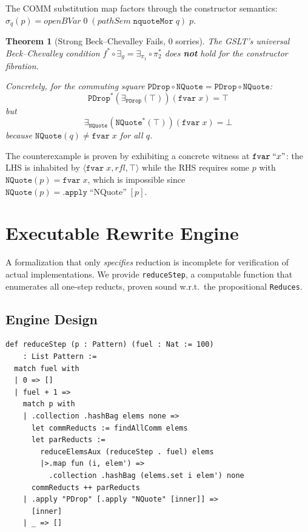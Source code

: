 \documentclass[]{article}
\newtheorem{theorem}{Theorem}
\newcommand{\code}[1]{\texttt{#1}}
\begin{document}
The COMM substitution map factors through the constructor semantics:
$\sigma_q(p) = \mathit{openBVar}\;0\;(\mathit{pathSem}\;\mathtt{nquoteMor}\;q)\;p$.

\begin{theorem}[Strong Beck--Chevalley Fails, 0 sorries]
\label{thm:bc-fails}
The GSLT's universal Beck--Chevalley condition
$f^* \circ \exists_g = \exists_{\pi_1} \circ \pi_2^*$
does \textbf{not} hold for the constructor fibration.

Concretely, for the commuting square
$\code{PDrop} \circ \code{NQuote} = \code{PDrop} \circ \code{NQuote}$:
$$\code{PDrop}^*(\exists_{\code{PDrop}}(\top))(\code{fvar}\;x) = \top$$
but
$$\exists_{\code{NQuote}}(\code{NQuote}^*(\top))(\code{fvar}\;x) = \bot$$
because $\code{NQuote}(q) \ne \code{fvar}\;x$ for all $q$.
\end{theorem}

The counterexample is proven by exhibiting a concrete witness at
$\code{fvar}\;``x"$: the LHS is inhabited by $\langle \code{fvar}\;x, \mathit{rfl},
\top \rangle$ while the RHS requires some $p$ with
$\code{NQuote}(p) = \code{fvar}\;x$, which is impossible since
$\code{NQuote}(p) = \code{.apply}\;\text{``NQuote''}\;[p]$.

\section{Executable Rewrite Engine}

A formalization that only \emph{specifies} reduction is incomplete for verification
of actual implementations.  We provide \code{reduceStep}, a computable function that
enumerates all one-step reducts, proven sound w.r.t.\ the propositional \code{Reduces}.

\subsection{Engine Design}

\begin{lstlisting}[caption={The executable engine (Engine.lean)}]
def reduceStep (p : Pattern) (fuel : Nat := 100)
    : List Pattern :=
  match fuel with
  | 0 => []
  | fuel + 1 =>
    match p with
    | .collection .hashBag elems none =>
      let commReducts := findAllComm elems
      let parReducts :=
        reduceElemsAux (reduceStep . fuel) elems
        |>.map fun (i, elem') =>
          .collection .hashBag (elems.set i elem') none
      commReducts ++ parReducts
    | .apply "PDrop" [.apply "NQuote" [inner]] =>
      [inner]
    | _ => []
\end{lstlisting}
\end{document}
